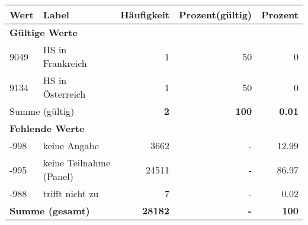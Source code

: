      \begin{longtable}{lXrrr}
     \toprule
     \textbf{Wert} & \textbf{Label} & \textbf{Häufigkeit} & \textbf{Prozent(gültig)} & \textbf{Prozent} \\
     \endhead
     \midrule
     \multicolumn{5}{l}{\textbf{Gültige Werte}}\\

     9049 &
     \multicolumn{1}{X}{ HS in Frankreich   } &


       \num{1} &
       \num[round-mode=places,round-precision=2]{50} &
         \num[round-mode=places,round-precision=2]{0} \\

     9134 &
     \multicolumn{1}{X}{ HS in Österreich   } &


       \num{1} &
       \num[round-mode=places,round-precision=2]{50} &
         \num[round-mode=places,round-precision=2]{0} \\
     \midrule
     \multicolumn{2}{l}{Summe (gültig)} &
       \textbf{\num{2}} &
     \textbf{100} &
       \textbf{\num[round-mode=places,round-precision=2]{0.01}} \\
     \multicolumn{5}{l}{\textbf{Fehlende Werte}}\\
       -998 &
       keine Angabe &
         \num{3662} &
        - &
         \num[round-mode=places,round-precision=2]{12.99} \\
       -995 &
       keine Teilnahme (Panel) &
         \num{24511} &
        - &
         \num[round-mode=places,round-precision=2]{86.97} \\
       -988 &
       trifft nicht zu &
         \num{7} &
        - &
         \num[round-mode=places,round-precision=2]{0.02} \\
     \midrule
     \multicolumn{2}{l}{\textbf{Summe (gesamt)}} &
          \textbf{\num{28182}} &
        \textbf{-} &
        \textbf{100} \\
     \bottomrule
     \end{longtable}
     

